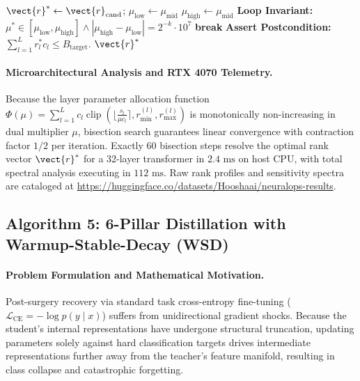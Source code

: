 \begin{algorithm}[H]
\begin{algorithmic}[1]
    \ENDFOR
        \STATE $\vect{r}^* \leftarrow \vect{r}_{\text{cand}}$; $\mu_{\text{low}} \leftarrow \mu_{\text{mid}}$ 
    \ELSE
        \STATE $\mu_{\text{high}} \leftarrow \mu_{\text{mid}}$ 
    \ENDIF
    \STATE \textbf{Loop Invariant:} $\mu^* \in [\mu_{\text{low}}, \mu_{\text{high}}] \land |\mu_{\text{high}} - \mu_{\text{low}}| = 2^{-k} \cdot 10^7$
        \STATE \textbf{break} 
    \ENDIF
\ENDFOR
\STATE \textbf{Assert Postcondition:} $\sum_{l=1}^L r_l^* c_l \le B_{\text{target}}$.
\RETURN $\vect{r}^*$
\end{algorithmic}
\end{algorithm}

\paragraph{Microarchitectural Analysis and RTX 4070 Telemetry.}
Because the layer parameter allocation function $\Phi(\mu) = \sum_{l=1}^L c_l \operatorname{clip}(\lfloor \frac{s_l}{\mu c_l} \rceil, r_{\min}^{(l)}, r_{\max}^{(l)})$ is monotonically non-increasing in dual multiplier $\mu$, bisection search guarantees linear convergence with contraction factor $1/2$ per iteration. Exactly $60$ bisection steps resolve the optimal rank vector $\vect{r}^*$ for a 32-layer transformer in $2.4\text{ ms}$ on host CPU, with total spectral analysis executing in $112\text{ ms}$. Raw rank profiles and sensitivity spectra are cataloged at \url{https://huggingface.co/datasets/Hooshaai/neuralops-results}.

\subsection{Algorithm 5: 6-Pillar Distillation with Warmup-Stable-Decay (WSD)}
\label{subsec:alg_distillation_wsd}

\paragraph{Problem Formulation and Mathematical Motivation.}
Post-surgery recovery via standard task cross-entropy fine-tuning ($\mathcal{L}_{\text{CE}} = -\log p(y \mid x)$) suffers from unidirectional gradient shocks. Because the student's internal representations have undergone structural truncation, updating parameters solely against hard classification targets drives intermediate representations further away from the teacher's feature manifold, resulting in class collapse and catastrophic forgetting.

